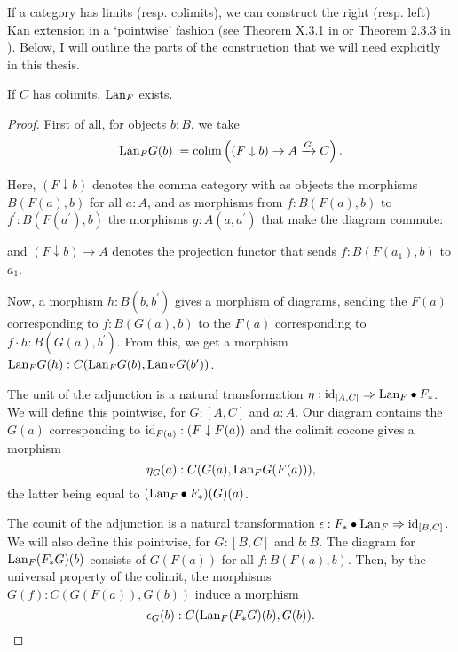 If a category has limits (resp. colimits), we can construct the right (resp. left) Kan extension in a `pointwise' fashion (see Theorem X.3.1 in \autocite{MacLane} or Theorem 2.3.3 in \autocite{Kashiwara}). Below, I will outline the parts of the construction that we will need explicitly in this thesis.
\begin{lemma}
  If $ C $ has colimits, $ \text{Lan}_{F} $ exists.
\end{lemma}
\begin{proof}
  First of all, for objects $ b: B $, we take
  \[ \text{Lan}_{F}G(b) := \text{colim} \left( (F \downarrow b) \to A \xrightarrow G C \right). \]

  Here, $ (F \downarrow b) $ denotes the comma category with as objects the morphisms $ B(F(a), b) $ for all $ a: A $, and as morphisms from $ f: B(F(a), b) $ to $ f^\prime: B(F(a^\prime), b) $ the morphisms $ g: A(a, a^\prime) $ that make the diagram commute:
  \begin{center}
  \end{center}
  and $ (F \downarrow b) \to A $ denotes the projection functor that sends $ f: B(F(a_1), b) $ to $ a_1 $.

  Now, a morphism $ h: B(b, b^\prime) $ gives a morphism of diagrams, sending the $ F(a) $ corresponding to $ f: B(G(a), b) $ to the $ F(a) $ corresponding to $ f \cdot h: B(G(a), b^\prime) $. From this, we get a morphism $ \text{Lan}_{F}G(h): C(\text{Lan}_{F}G(b), \text{Lan}_{F}G(b^\prime)) $.

  The unit of the adjunction is a natural transformation $ \eta: \text{id}_{[A, C]} \Rightarrow \text{Lan}_{F} \bullet F_* $. We will define this pointwise, for $ G: [A, C] $ and $ a: A $. Our diagram contains the $ G(a) $ corresponding to $ \text{id}_{F(a)}: (F \downarrow F(a)) $ and the colimit cocone gives a morphism
  \[ \eta_G(a) : C(G(a), \text{Lan}_{F}G (F(a))), \]
  the latter being equal to $ (\text{Lan}_{F} \bullet F_*)(G)(a) $.

  The counit of the adjunction is a natural transformation $ \epsilon: F_* \bullet \text{Lan}_{F} \Rightarrow \text{id}_{[B, C]} $. We will also define this pointwise, for $ G: [B, C] $ and $ b: B $. The diagram for $ \text{Lan}_{F}(F_* G)(b) $ consists of $ G(F(a)) $ for all $ f: B(F(a), b) $. Then, by the universal property of the colimit, the morphisms $ G(f): C(G(F(a)), G(b)) $ induce a morphism
  \[ \epsilon_G(b) : C(\text{Lan}_{F}(F_* G)(b), G(b)). \]
\end{proof}

